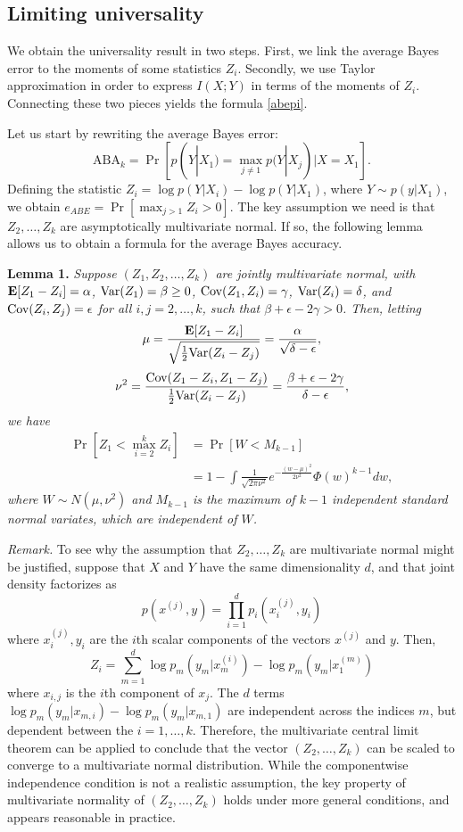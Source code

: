 \subsection{Limiting universality}

We obtain the universality result in two steps.  First, we link the
average Bayes error to the moments of some statistics $Z_i$.
Secondly, we use Taylor approximation in order to express $I(X; Y)$ in
terms of the moments of $Z_i$.  Connecting these two pieces yields the
formula \eqref{abepi}.

Let us start by rewriting the average Bayes error:
\[
\text{ABA}_k = \Pr[p(Y|X_1) = \max_{j \neq 1} p(Y|X_j)| X = X_1].
\]
Defining the statistic $Z_i = \log p(Y|X_i) - \log p(Y|X_1)$, where $Y
\sim p(y|X_1)$, we obtain $ e_{ABE} = \Pr[\max_{j > 1} Z_i > 0].  $
The key assumption we need is that $Z_2,\hdots, Z_k$ are
asymptotically multivariate normal.  If so, the following lemma allows
us to obtain a formula for the average Bayes accuracy.

\textbf{Lemma 1. }
\emph{
Suppose $(Z_1, Z_2, \hdots, Z_k)$ are jointly multivariate normal, with 
$\textbf{E}[Z_1 - Z_i]= \alpha$, 
$\text{Var}(Z_1) = \beta \geq 0$, 
$\text{Cov}(Z_1, Z_i) = \gamma$, 
$\text{Var}(Z_i)= \delta$, and $\text{Cov}(Z_i, Z_j) = \epsilon$ for all $i, j = 2, \hdots,
k$, such that $\beta + \epsilon - 2\gamma > 0$.  Then, letting
\[
\mu = \frac{\textbf{E}[Z_1 - Z_i]}{\sqrt{\frac{1}{2}\text{Var}(Z_i - Z_j)}} = \frac{\alpha}{\sqrt{\delta - \epsilon}},
\]
\[
\nu^2 = \frac{\text{Cov}(Z_1 -Z_i, Z_1 - Z_j)}{\frac{1}{2}\text{Var}(Z_i - Z_j)} = \frac{\beta + \epsilon - 2\gamma}{\delta - \epsilon},
\]
we have
\begin{align*}
\Pr[Z_1 < \max_{i=2}^k Z_i] &= \Pr[W < M_{k-1}]
\\&= 1 - \int \frac{1}{\sqrt{2\pi\nu^2}} e^{-\frac{(w-\mu)^2}{2\nu^2}} \Phi(w)^{k-1} dw,
\end{align*}
where $W \sim N(\mu, \nu^2)$ and $M_{k-1}$ is the maximum of $k-1$
independent standard normal variates, which are independent of $W$.
}

\emph{Remark.}
To see why the assumption that $Z_2,\hdots, Z_k$ are multivariate
normal might be justified, suppose that $X$ and $Y$ have the same
dimensionality $d$, and that joint density factorizes as
\[
p(x^{(j)}, y) = \prod_{i=1}^d p_i(x^{(j)}_i, y_i)
\]
where $x_i^{(j)}, y_i$ are the $i$th scalar components of the vectors $x^{(j)}$ and $y$.
Then,
\[
Z_i = \sum_{m=1}^d \log p_m(y_m | x^{(i)}_m) - \log p_m(y_m | x^{(m)}_1)
\]
where $x_{i, j}$ is the $i$th component of $x_j$.  The $d$ terms $\log
p_m(y_m | x_{m, i}) - \log p_m(y_m | x_{m, 1})$ are independent across
the indices $m$, but dependent between the $i = 1,\hdots, k$.
Therefore, the multivariate central limit theorem can be applied to
conclude that the vector $(Z_2,\hdots, Z_k)$ can be scaled to converge
to a multivariate normal distribution.  While the componentwise
independence condition is not a realistic assumption, the key property
of multivariate normality of $(Z_2,\hdots, Z_k)$ holds under more
general conditions, and appears reasonable in practice.

